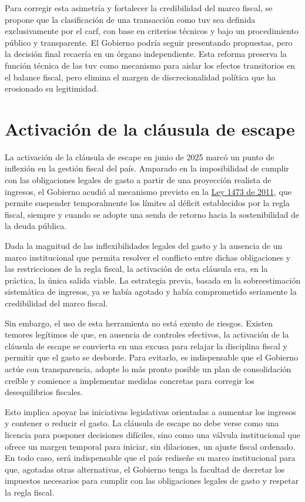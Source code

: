 Para corregir esta asimetría y fortalecer la credibilidad del marco fiscal, se propone que la clasificación de una transacción como \gls{tuv} sea definida exclusivamente por el \gls{carf}, con base en criterios técnicos y bajo un procedimiento público y transparente. El Gobierno podría seguir presentando propuestas, pero la decisión final recaería en un órgano independiente. Esta reforma preserva la función técnica de las \gls{tuv} como mecanismo para aislar los efectos transitorios en el balance fiscal, pero elimina el margen de discrecionalidad política que ha erosionado su legitimidad.

\section{Activación de la cláusula de escape}

La activación de la cláusula de escape en junio de 2025 marcó un punto de inflexión en la gestión fiscal del país. Amparado en la imposibilidad de cumplir con las obligaciones legales de gasto a partir de una proyección realista de ingresos, el Gobierno acudió al mecanismo previsto en la \href{https://www.funcionpublica.gov.co/eva/gestornormativo/norma.php?i=42956}{Ley 1473 de 2011}, que permite suspender temporalmente los límites al déficit establecidos por la regla fiscal, siempre y cuando se adopte una senda de retorno hacia la sostenibilidad de la deuda pública.

Dada la magnitud de las inflexibilidades legales del gasto y la ausencia de un marco institucional que permita resolver el conflicto entre dichas obligaciones y las restricciones de la regla fiscal, la activación de esta cláusula era, en la práctica, la única salida viable. La estrategia previa, basada en la sobreestimación sistemática de ingresos, ya se había agotado y había comprometido seriamente la credibilidad del marco fiscal.

Sin embargo, el uso de esta herramienta no está exento de riesgos. Existen temores legítimos de que, en ausencia de controles efectivos, la activación de la cláusula de escape se convierta en una excusa para relajar la disciplina fiscal y permitir que el gasto se desborde. Para evitarlo, es indispensable que el Gobierno actúe con transparencia, adopte lo más pronto posible un plan de consolidación creíble y comience a implementar medidas concretas para corregir los desequilibrios fiscales.

Esto implica apoyar las iniciativas legislativas orientadas a aumentar los ingresos y contener o reducir el gasto. La cláusula de escape no debe verse como una licencia para posponer decisiones difíciles, sino como una válvula institucional que ofrece un margen temporal para iniciar, sin dilaciones, un ajuste fiscal ordenado. En todo caso, será indispensable que el país rediseñe su marco institucional para que, agotadas otras alternativas, el Gobierno tenga la facultad de decretar los impuestos necesarios para cumplir con las obligaciones legales de gasto y respetar la regla fiscal.

